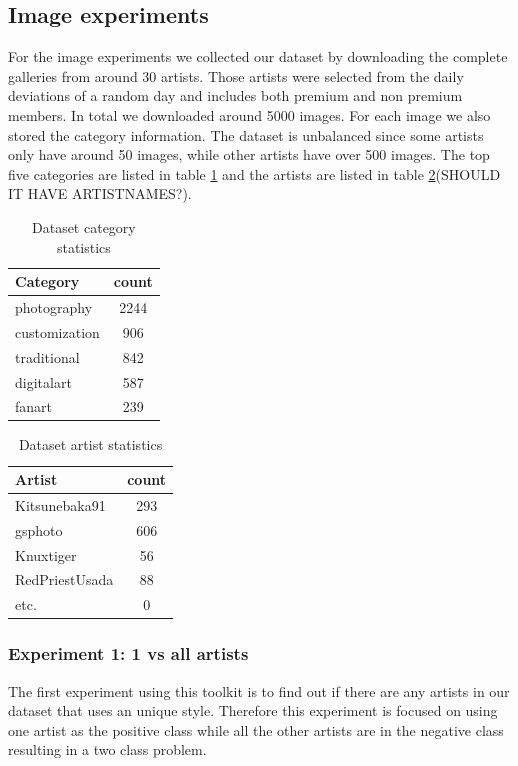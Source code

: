 \subsection{Image experiments}
For the image experiments we collected our dataset by downloading the complete galleries from around 30 artists.
Those artists were selected from the daily deviations of a random day and includes both premium and non premium members.
In total we downloaded around 5000 images. 
For each image we also stored the category information.
The dataset is unbalanced since some artists only have around 50 images, while other artists have over 500 images.
The top five categories are listed in table \ref{datasetstats} and the artists are listed in table \ref{userstats}(SHOULD IT HAVE ARTISTNAMES?).

\begin{table}
    \centering
    \begin{tabular}
        { | l | c | } 
        \hline
        Category & count \\
        \hline
        photography & 2244 \\ 
        customization & 906 \\ 
        traditional & 842 \\ 
        digitalart & 587 \\ 
        fanart & 239 \\ 
        \hline 
    \end{tabular}
    \caption{Dataset category statistics}
    \label{datasetstats}
\end{table}

\begin{table}
    \centering
    \begin{tabular}
        { | l | c | } 
        \hline
        Artist & count \\
        \hline
        Kitsunebaka91 & 293 \\ 
        gsphoto & 606 \\ 
        Knuxtiger & 56 \\ 
        RedPriestUsada & 88 \\ 
        etc. & 0 \\
        \hline
    \end{tabular}
    \caption{Dataset artist statistics}
    \label{userstats}
\end{table}

\subsubsection{Experiment 1: 1 vs all artists}
The first experiment using this toolkit is to find out if there are any artists in our dataset that uses an unique style.
Therefore this experiment is focused on using one artist as the positive class while all the other artists are in the negative class resulting in a two class problem.

